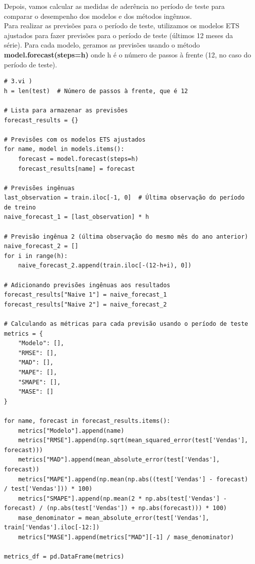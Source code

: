 \documentclass[a4paper, 12pt]{article}
\begin{document}
Depois, vamos calcular as medidas de aderência no período de teste para comparar o desempenho dos modelos e dos métodos ingênuos.\\

Para realizar as previsões para o período de teste, utilizamos os modelos ETS ajustados para fazer previsões para o período de teste (últimos 12 meses da série). Para cada modelo, geramos as previsões usando o método \textbf{model.forecast(steps=h)} onde h é o número de passos à frente (12, no caso do período de teste).\\


\begin{lstlisting}[style=python]
# 3.vi )
h = len(test)  # Número de passos à frente, que é 12

# Lista para armazenar as previsões
forecast_results = {}

# Previsões com os modelos ETS ajustados
for name, model in models.items():
    forecast = model.forecast(steps=h)
    forecast_results[name] = forecast

# Previsões ingênuas
last_observation = train.iloc[-1, 0]  # Última observação do período de treino
naive_forecast_1 = [last_observation] * h

# Previsão ingênua 2 (última observação do mesmo mês do ano anterior)
naive_forecast_2 = []
for i in range(h):
    naive_forecast_2.append(train.iloc[-(12-h+i), 0])

# Adicionando previsões ingênuas aos resultados
forecast_results["Naive 1"] = naive_forecast_1
forecast_results["Naive 2"] = naive_forecast_2

# Calculando as métricas para cada previsão usando o período de teste
metrics = {
    "Modelo": [],
    "RMSE": [],
    "MAD": [],
    "MAPE": [],
    "SMAPE": [],
    "MASE": []
}

for name, forecast in forecast_results.items():
    metrics["Modelo"].append(name)
    metrics["RMSE"].append(np.sqrt(mean_squared_error(test['Vendas'], forecast)))
    metrics["MAD"].append(mean_absolute_error(test['Vendas'], forecast))
    metrics["MAPE"].append(np.mean(np.abs((test['Vendas'] - forecast) / test['Vendas'])) * 100)
    metrics["SMAPE"].append(np.mean(2 * np.abs(test['Vendas'] - forecast) / (np.abs(test['Vendas']) + np.abs(forecast))) * 100)
    mase_denominator = mean_absolute_error(test['Vendas'], train['Vendas'].iloc[-12:])
    metrics["MASE"].append(metrics["MAD"][-1] / mase_denominator)

metrics_df = pd.DataFrame(metrics)
    \end{lstlisting} \\
\end{document}
